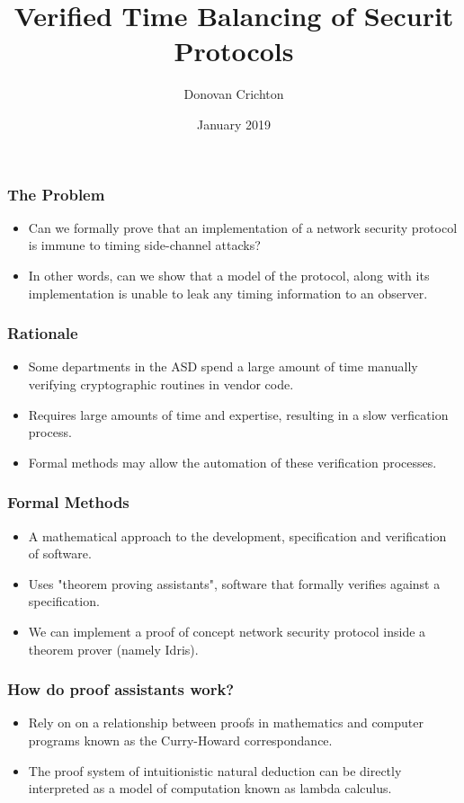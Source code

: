 \documentclass{beamer}
\title{Verified Time Balancing of Securit Protocols}
\author{Donovan Crichton}
\date{January 2019}
\begin{document}
 
\frame{\titlepage}

\begin{frame}[fragile]
  \frametitle{The Problem}
  \begin{itemize}
    \item Can we formally prove that an implementation of
            a network security protocol is immune to 
                  timing side-channel attacks?
    \item In other words, can we show that a model of the protocol,
            along with its implementation is unable to leak
                  any timing information to an observer.
  \end{itemize}
\end{frame}

\begin{frame}[fragile]
  \frametitle{Rationale}
  \begin{itemize}
    \item Some departments in the ASD spend a large amount of time
            manually verifying cryptographic routines in vendor
            code.
    \item Requires large amounts of time and expertise, resulting
            in a slow verfication process.
    \item Formal methods may allow the 
            automation of these verification processes.
  \end{itemize}
\end{frame}

\begin{frame}[fragile]
  \frametitle{Formal Methods}
    \begin{itemize}
      \item A mathematical approach to the 
              development, specification and verification of 
                    software.
      \item Uses "theorem proving assistants", software that
              formally verifies against a specification.
      \item We can implement a proof of concept network security 
              protocol inside a theorem prover (namely Idris).
    \end{itemize}
\end{frame}

\begin{frame}[fragile]
  \frametitle{How do proof assistants work?}
    \begin{itemize}
      \item Rely on on a relationship between proofs in mathematics
              and computer programs known as the Curry-Howard 
                    correspondance.
      \item The proof system of intuitionistic 
              natural deduction can be directly interpreted 
                    as a model of computation known as 
                    lambda calculus.
    \end{itemize}
\end{frame}
\end{document}
